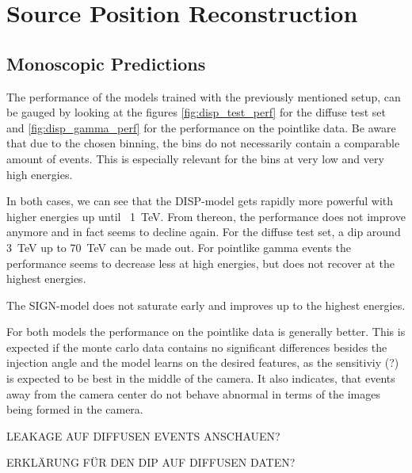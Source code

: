 \section{Source Position Reconstruction}\label{position}

\subsection{Monoscopic Predictions}

The performance of the models trained with the previously mentioned setup,
can be gauged by looking at the 
figures \ref{fig:disp_test_perf} for the diffuse test set and 
\ref{fig:disp_gamma_perf} for the performance on the 
pointlike data. Be aware that due to the chosen binning,
the bins do not necessarily contain a comparable amount of events.
This is especially relevant for the bins at very low and very high energies.

In both cases, we can see that the DISP-model gets rapidly more
powerful with higher energies up until ~\SI{1}{\tera\electronvolt}. From 
thereon, the performance does not improve anymore and in fact seems to decline
again. For the diffuse test set, a dip around \SI{3}{\tera\electronvolt}
up to \SI{70}{\tera\electronvolt} can be made out.
For pointlike gamma events the performance seems to decrease less at high energies, but does not 
recover at the highest energies.

The SIGN-model does not saturate early and improves up to the highest energies. 

For both models the performance on the pointlike data is generally better.
This is expected if the monte carlo data contains no significant differences besides
the injection angle and the model learns on the desired features, as
the sensitiviy (?) is expected to be best in the middle of the camera.
It also indicates, that events away from the camera center do not behave abnormal 
in terms of the images being formed in the camera.

LEAKAGE AUF DIFFUSEN EVENTS ANSCHAUEN?

ERKLÄRUNG FÜR DEN DIP AUF DIFFUSEN DATEN?

